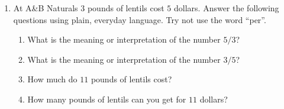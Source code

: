 \documentclass[12pt]{article}
\begin{document}
\begin{enumerate}
\item At A\&B Naturals $3$ pounds of lentils cost $5$ dollars. 
Answer the following questions using plain, everyday language.  Try not
use the word ``per''. 
\begin{enumerate}
\item What is the meaning or interpretation of the number $5/3$?
\item What is the meaning or interpretation of the number $3/5$? 
\item How much do $11$ pounds of lentils cost?
\item How many pounds of lentils can you get for $11$ dollars? 
\end{enumerate}

\end{enumerate}
\end{document}
